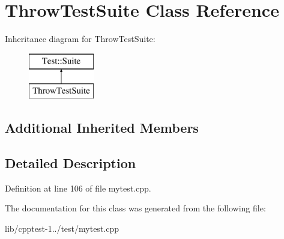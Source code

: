 \hypertarget{class_throw_test_suite}{}\section{Throw\+Test\+Suite Class Reference}
\label{class_throw_test_suite}
Inheritance diagram for Throw\+Test\+Suite\+:\begin{figure}[H]
\begin{center}
\leavevmode
\includegraphics[height=2.000000cm]{class_throw_test_suite}
\end{center}
\end{figure}
\subsection*{Additional Inherited Members}


\subsection{Detailed Description}


Definition at line 106 of file mytest.\+cpp.



The documentation for this class was generated from the following file\+:\begin{DoxyCompactItemize}
\item 
lib/cpptest-\/1../test/mytest.\+cpp\end{DoxyCompactItemize}
